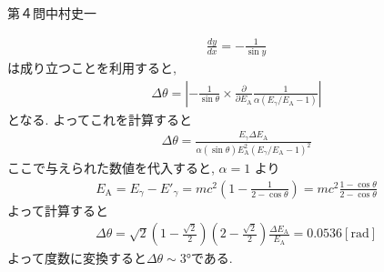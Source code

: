 \begin{answer}{第４問}{中村史一}
\begin{enumerate}
  \begin{align}
    \frac{dy}{dx} = -\frac1{\sin y}
  \end{align}
  は成り立つことを利用すると, 
  \begin{align}
    \Delta \theta = \left|-\frac1{\sin\theta}
      \times\frac{\partial}{\partial E_\mathrm{A}}
        \frac1{\alpha(E_\gamma/E_\mathrm{A}-1)}
      \right|
  \end{align}
  となる. よってこれを計算すると
  \begin{align}
    \Delta\theta = \frac{E_\gamma\Delta E_\mathrm{A}}{\alpha(\sin\theta)E_\mathrm{A}^2(E_\gamma/E_\mathrm{A}-1)^2}
  \end{align}
  ここで与えられた数値を代入すると, $\alpha=1$ より
  \begin{align}
    E_\mathrm{A} = E_\gamma-E'_\gamma = mc^2\left(1-\frac1{2-\cos\theta}\right) = mc^2\frac{1-\cos\theta}{2-\cos\theta}
  \end{align}
  よって計算すると
  \begin{align}
    \Delta \theta = \sqrt2\left(1-\frac{\sqrt{2}}2\right)\left(2-\frac{\sqrt{2}}2\right)\frac{\Delta E_\mathrm{A}}{E_\mathrm{A}} = 0.0536[\mathrm{rad}]
  \end{align}
  よって度数に変換すると$\Delta\theta\sim3$°である. 
\end{enumerate}
\end{answer}


